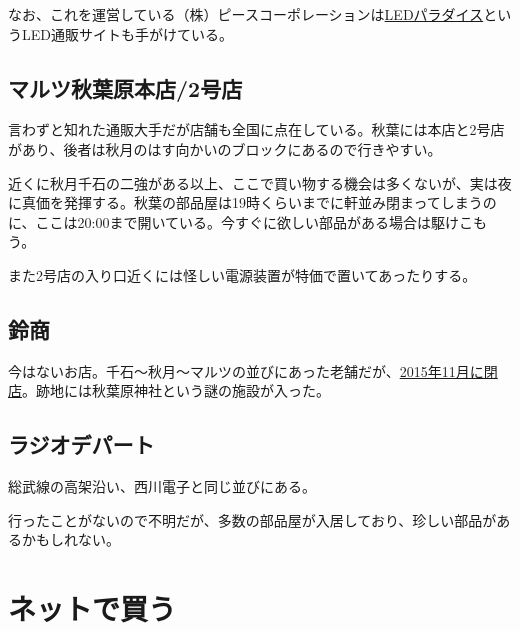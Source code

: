 \documentclass[letterpaper,10pt,dvipdfmx]{sphinxmanual}
\begin{document}
なお、これを運営している（株）ピースコーポレーションは\href{http://www.led-paradise.com/}{LEDパラダイス}というLED通販サイトも手がけている。


\subsection{マルツ秋葉原本店/2号店}
\label{\detokenize{buy_parts:}}\label{\detokenize{buy_parts:id9}}
言わずと知れた通販大手だが店舗も全国に点在している。秋葉には本店と2号店があり、後者は秋月のはす向かいのブロックにあるので行きやすい。

近くに秋月千石の二強がある以上、ここで買い物する機会は多くないが、実は夜に真価を発揮する。秋葉の部品屋は19時くらいまでに軒並み閉まってしまうのに、ここは20:00まで開いている。今すぐに欲しい部品がある場合は駆けこもう。

また2号店の入り口近くには怪しい電源装置が特価で置いてあったりする。


\subsection{鈴商}
\label{\detokenize{buy_parts:}}\label{\detokenize{buy_parts:id10}}
今はないお店。千石〜秋月〜マルツの並びにあった老舗だが、\href{http://rocketnews24.com/2015/11/27/671666/}{2015年11月に閉店}。跡地には秋葉原神社という謎の施設が入った。


\subsection{ラジオデパート}
\label{\detokenize{buy_parts:}}\label{\detokenize{buy_parts:id11}}
総武線の高架沿い、西川電子と同じ並びにある。

行ったことがないので不明だが、多数の部品屋が入居しており、珍しい部品があるかもしれない。


\section{ネットで買う}
\label{\detokenize{buy_parts:}}\label{\detokenize{buy_parts:id12}}
\end{document}
